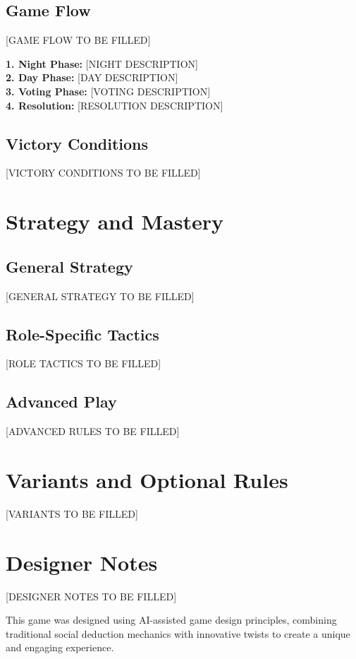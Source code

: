 \documentclass[12pt,a4paper,onecolumn,titlepage]{nierAutomata}
\begin{document}
\subsection{Game Flow}
[GAME FLOW TO BE FILLED]

\begin{center}
\begin{nierbox}[title=Phase Overview]
  \nierdiamond 
  \textbf{1. Night Phase:} [NIGHT DESCRIPTION] \\
  \textbf{2. Day Phase:} [DAY DESCRIPTION] \\
  \textbf{3. Voting Phase:} [VOTING DESCRIPTION] \\
  \textbf{4. Resolution:} [RESOLUTION DESCRIPTION]
\end{nierbox}
\end{center}

\subsection{Victory Conditions}
[VICTORY CONDITIONS TO BE FILLED]

\section{Strategy and Mastery}

\subsection{General Strategy}
[GENERAL STRATEGY TO BE FILLED]

\begin{center}
\begin{nierbox}[title=Strategic Tips]
\end{nierbox}
\end{center}

\subsection{Role-Specific Tactics}
[ROLE TACTICS TO BE FILLED]

\subsection{Advanced Play}
[ADVANCED RULES TO BE FILLED]

\section{Variants and Optional Rules}
[VARIANTS TO BE FILLED]

\section{Designer Notes}
[DESIGNER NOTES TO BE FILLED]

This game was designed using AI-assisted game design principles, combining traditional social deduction mechanics with innovative twists to create a unique and engaging experience.
\end{document}
